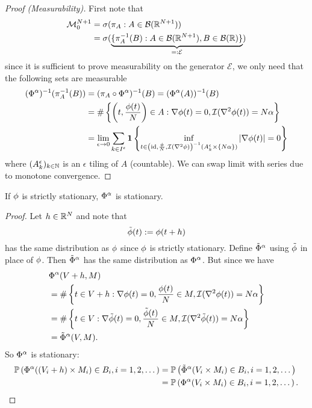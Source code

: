 \begin{proof}[Proof (Measurability)]
	First note that	
	\begin{align*}
		\locFiniteMeasAlg[\dimension+1]
		&= \sigma(\pi_A : A\in\borel(\real^{\dimension+1}))\\
		&=\sigma(\underbrace{
			\{\pi_A^{-1}(B) : A\in\borel(\real^{\dimension+1}), B\in\borel(\real)\}
		}_{=:\mathcal{E}}
		)
	\end{align*}
	since it is sufficient to prove measurability on the generator
	\(\mathcal{E}\), we only need that the following sets are measurable
	\begin{align*}
		(\crit^\alpha)^{-1}(\pi^{-1}_{ A }(B))
		&= (\pi_{A} \circ \crit^\alpha)^{-1}(B)
		= (\crit^\alpha(A))^{-1}(B)\\
		&= \#\left\{\left(t,\frac{\rf(t)}{\dimension}\right) \in A:
			\nabla\rf(t)=0,
			\negEV(\nabla^2 \rf(t))=\dimension\alpha
		\right\}\\
		&= \lim_{\epsilon\to 0} \sum_{k\in I^\epsilon}
		\ind\left\{
			\inf_{t\in \left(\text{id}, \frac{\rf}\dimension, \negEV(\nabla^2\rf)\right)^{-1}(A^\epsilon_k\times \{\dimension\alpha\}) }
		|\nabla \rf(t)| = 0
		\right\}
	\end{align*}
	where \((A^\epsilon_k)_{k\in\nat}\) is an \(\epsilon\) tiling of \(A\) (countable).
	We can swap limit with series due to monotone convergence.
\end{proof}

\begin{lemma}[Stationarity]
	If \(\rf\) is strictly stationary, \(\crit^\alpha\) is stationary.
\end{lemma}
\begin{proof}
	Let \(h\in \real^\dimension\) and note that
	\[
		\tilde{\rf}(t) := \rf(t+h)
	\]
	has the same distribution as \(\rf\) since \(\rf\) is strictly stationary. Define
	\(\tilde{\crit}^\alpha\) using \(\tilde{\rf}\) in place of \(\rf\). Then
	\(\tilde{\crit}^\alpha\) has the same distribution as \(\crit^\alpha\).
	But since we have
	\begin{align*}
		&\crit^\alpha(\Vol+h, M)\\
		&= \#\left\{t\in\Vol+h:
			\nabla\rf(t)=0,
			\frac{\rf(t)}{\dimension}\in M,
			\negEV(\nabla^2 \rf(t))=\dimension\alpha
		\right\}\\
		&= \#\left\{t\in\Vol:
			\nabla\tilde{\rf}(t)=0,
			\frac{\tilde{\rf}(t)}{\dimension}\in M,
			\negEV(\nabla^2 \tilde{\rf}(t))=\dimension\alpha
		\right\}\\
		&= \tilde{\crit}^\alpha(\Vol, M).
	\end{align*}
	So \(\crit^\alpha\) is stationary:
	\begin{align*}
		\Pr\left(\crit^\alpha((\Vol_i+h)\times M_i)\in B_i, i=1,2,\dots\right)
		&= \Pr\left(\tilde{\crit}^\alpha(\Vol_i\times M_i)\in B_i, i=1,2,\dots\right)\\
		&= \Pr\left(\crit^\alpha(\Vol_i\times M_i)\in B_i, i=1,2,\dots\right).
		\qedhere
	\end{align*}
\end{proof}

